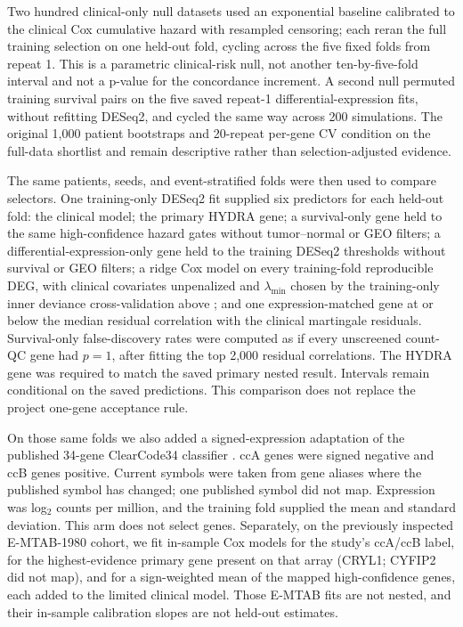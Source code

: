 Two hundred clinical-only null datasets used an exponential baseline calibrated to the clinical Cox cumulative hazard with resampled censoring; each reran the full training selection on one held-out fold, cycling across the five fixed folds from repeat 1. This is a parametric clinical-risk null, not another ten-by-five-fold interval and not a p-value for the concordance increment. A second null permuted training survival pairs on the five saved repeat-1 differential-expression fits, without refitting DESeq2, and cycled the same way across 200 simulations. The original 1,000 patient bootstraps and 20-repeat per-gene CV condition on the full-data shortlist and remain descriptive rather than selection-adjusted evidence.

The same patients, seeds, and event-stratified folds were then used to compare selectors. One training-only DESeq2 fit supplied six predictors for each held-out fold: the clinical model; the primary HYDRA gene; a survival-only gene held to the same high-confidence hazard gates without tumor--normal or GEO filters; a differential-expression-only gene held to the training DESeq2 thresholds without survival or GEO filters; a ridge Cox model on every training-fold reproducible DEG, with clinical covariates unpenalized and $\lambda_{\min}$ chosen by the training-only inner deviance cross-validation above \cite{simon_glmnet_cox_2011}; and one expression-matched gene at or below the median residual correlation with the clinical martingale residuals. Survival-only false-discovery rates were computed as if every unscreened count-QC gene had $p=1$, after fitting the top 2,000 residual correlations. The HYDRA gene was required to match the saved primary nested result. Intervals remain conditional on the saved predictions. This comparison does not replace the project one-gene acceptance rule.

On those same folds we also added a signed-expression adaptation of the published 34-gene ClearCode34 classifier \cite{brooks_clearcode34_2014}. ccA genes were signed negative and ccB genes positive. Current symbols were taken from gene aliases where the published symbol has changed; one published symbol did not map. Expression was log$_2$ counts per million, and the training fold supplied the mean and standard deviation. This arm does not select genes. Separately, on the previously inspected E-MTAB-1980 cohort, we fit in-sample Cox models for the study's ccA/ccB label, for the highest-evidence primary gene present on that array (CRYL1; CYFIP2 did not map), and for a sign-weighted mean of the mapped high-confidence genes, each added to the limited clinical model. Those E-MTAB fits are not nested, and their in-sample calibration slopes are not held-out estimates.

